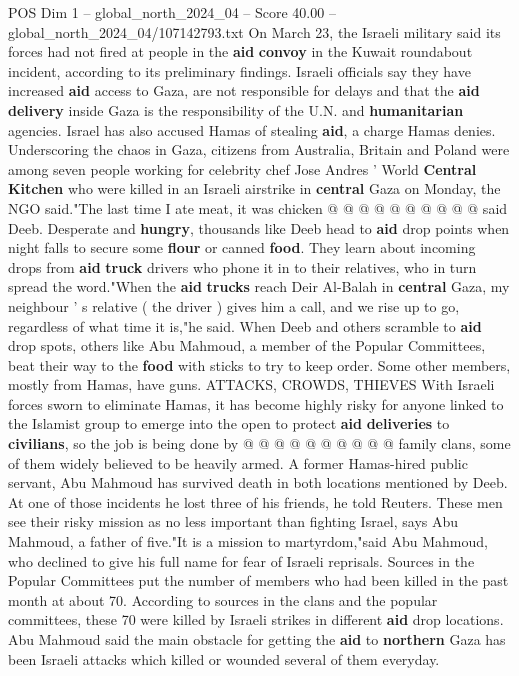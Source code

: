 \begin{textsample}{POS Dim 1 – global\_north\_2024\_04 – Score 40.00 – global\_north\_2024\_04/107142793.txt}
On March 23, the Israeli military said its forces had not fired at people in the \textbf{aid} \textbf{convoy} in the Kuwait roundabout incident, according to its preliminary findings.
Israeli officials say they have increased \textbf{aid} access to Gaza, are not responsible for delays and that the \textbf{aid} \textbf{delivery} inside Gaza is the responsibility of the U.N. and \textbf{humanitarian} agencies.
Israel has also accused Hamas of stealing \textbf{aid}, a charge Hamas denies.
Underscoring the chaos in Gaza, citizens from Australia, Britain and Poland were among seven people working for celebrity chef Jose Andres ' World \textbf{Central} \textbf{Kitchen} who were killed in an Israeli airstrike in \textbf{central} Gaza on Monday, the NGO said."The last time I ate meat, it was chicken @ @ @ @ @ @ @ @ @ @ said Deeb.
Desperate and \textbf{hungry}, thousands like Deeb head to \textbf{aid} drop points when night falls to secure some \textbf{flour} or canned \textbf{food}.
They learn about incoming drops from \textbf{aid} \textbf{truck} drivers who phone it in to their relatives, who in turn spread the word."When the \textbf{aid} \textbf{trucks} reach Deir Al-Balah in \textbf{central} Gaza, my neighbour ' s relative ( the driver ) gives him a call, and we rise up to go, regardless of what time it is,"he said.
When Deeb and others scramble to \textbf{aid} drop spots, others like Abu Mahmoud, a member of the Popular Committees, beat their way to the \textbf{food} with sticks to try to keep order.
Some other members, mostly from Hamas, have guns.
ATTACKS, CROWDS, THIEVES With Israeli forces sworn to eliminate Hamas, it has become highly risky for anyone linked to the Islamist group to emerge into the open to protect \textbf{aid} \textbf{deliveries} to \textbf{civilians}, so the job is being done by @ @ @ @ @ @ @ @ @ @ family clans, some of them widely believed to be heavily armed.
A former Hamas-hired public servant, Abu Mahmoud has survived death in both locations mentioned by Deeb.
At one of those incidents he lost three of his friends, he told Reuters.
These men see their risky mission as no less important than fighting Israel, says Abu Mahmoud, a father of five."It is a mission to martyrdom,"said Abu Mahmoud, who declined to give his full name for fear of Israeli reprisals.
Sources in the Popular Committees put the number of members who had been killed in the past month at about 70.
According to sources in the clans and the popular committees, these 70 were killed by Israeli strikes in different \textbf{aid} drop locations.
Abu Mahmoud said the main obstacle for getting the \textbf{aid} to \textbf{northern} Gaza has been Israeli attacks which killed or wounded several of them everyday.

\end{textsample}

